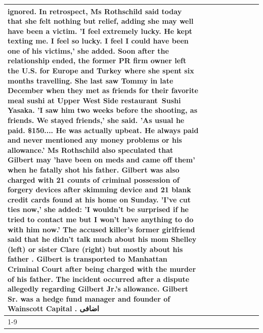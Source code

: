\begin{table}[H]
\begin{tabular}{lllrlllll}
ignored. In retrospect, Ms Rothschild said today that she felt nothing but relief, adding she may well have been a victim. 'I feel extremely lucky. He kept texting me. I feel so lucky. I feel I could have been one of his victims,' she added. Soon after the relationship ended, the former PR firm owner left the U.S. for Europe and Turkey where she spent six months  travelling. She last saw Tommy in late December when they met as friends for their favorite meal sushi at Upper West Side restaurant Sushi Yasaka. 'I saw him two weeks before the shooting, as friends. We stayed friends,' she said. 'As usual he paid. \$150.... He was actually upbeat. He always paid and never mentioned any money problems or his allowance.' Ms Rothschild also speculated that Gilbert may 'have been on meds and came off them' when he fatally shot his father. Gilbert was also charged with 21 counts of criminal possession of forgery devices after skimming device and 21 blank credit cards found at his home on Sunday. 'I've cut ties now,' she added: 'I wouldn’t be surprised if he tried to contact me but I won’t have anything to do with him now.' The accused killer's former girlfriend said that he didn't talk much about his mom Shelley (left) or sister Clare (right) but mostly about his father . Gilbert is transported to Manhattan Criminal Court  after being charged with the murder of his father. The incident occurred after a dispute allegedly regarding Gilbert Jr.'s allowance. Gilbert Sr. was a hedge fund manager and founder of Wainscott Capital . اضافی \\
\cline{1-9}

\end{tabular}
\end{table}
